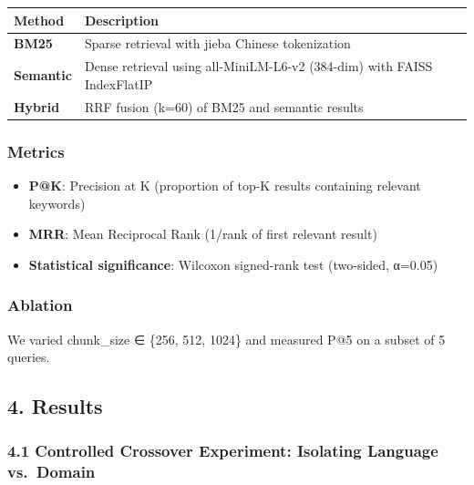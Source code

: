 \documentclass[
]{article}
\providecommand{\tightlist}{%
  \setlength{\itemsep}{0pt}\setlength{\parskip}{0pt}}
\begin{document}
\begin{longtable}[]{@{}
  >{\raggedright\arraybackslash}p{}
  >{\raggedright\arraybackslash}p{}@{}}
\toprule\noalign{}
\begin{minipage}[b]{\linewidth}\raggedright
Method
\end{minipage} & \begin{minipage}[b]{\linewidth}\raggedright
Description
\end{minipage} \\
\midrule\noalign{}
\endhead
\bottomrule\noalign{}
\endlastfoot
\textbf{BM25} & Sparse retrieval with jieba Chinese tokenization \\
\textbf{Semantic} & Dense retrieval using all-MiniLM-L6-v2 (384-dim)
with FAISS IndexFlatIP \\
\textbf{Hybrid} & RRF fusion (k=60) of BM25 and semantic results \\
\end{longtable}

\subsubsection{Metrics}\label{metrics}

\begin{itemize}
\tightlist
\item
  \textbf{P@K}: Precision at K (proportion of top-K results containing
  relevant keywords)
\item
  \textbf{MRR}: Mean Reciprocal Rank (1/rank of first relevant result)
\item
  \textbf{Statistical significance}: Wilcoxon signed-rank test
  (two-sided, α=0.05)
\end{itemize}

\subsubsection{Ablation}\label{ablation}

We varied chunk\_size ∈ \{256, 512, 1024\} and measured P@5 on a subset
of 5 queries.

\subsection{4. Results}\label{results}

\subsubsection{4.1 Controlled Crossover Experiment: Isolating Language
vs.~Domain}\label{controlled-crossover-experiment-isolating-language-vs.-domain}
\end{document}
